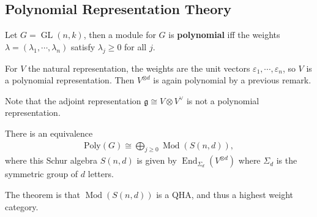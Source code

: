 \hypertarget{polynomial-representation-theory}{%
\subsection{Polynomial Representation
Theory}\label{polynomial-representation-theory}}

Let \(G = \operatorname{GL}(n, k)\), then a module for \(G\) is
\textbf{polynomial} iff the weights
\(\lambda = (\lambda_1, \cdots, \lambda_n)\) satisfy
\(\lambda_j \geq 0\) for all \(j\).

\begin{example}

\begin{example}

For \(V\) the natural representation, the weights are the unit vectors
\(\varepsilon_1, \cdots, \varepsilon_n\), so \(V\) is a polynomial
representation. Then \(V^{\otimes d}\) is again polynomial by a previous
remark.

\end{example}

\end{example}

\begin{remark}

\begin{remark}

Note that the adjoint representation
\({\mathfrak{g}}\cong V\otimes V^\vee\) is not a polynomial
representation.

\end{remark}

\end{remark}

\begin{theorem}[?]

\begin{theorem}[?]

There is an equivalence
\begin{align*}   \mathrm{Poly}(G) \cong \bigoplus_{j\geq 0} {\operatorname{Mod}}(S(n, d)) ,\end{align*}
where this Schur algebra \(S(n, d)\) is given by
\(\operatorname{End}_{\Sigma_d}(V^{\otimes d})\) where \(\Sigma_d\) is
the symmetric group of \(d\) letters.

The theorem is that \({\operatorname{Mod}}(S(n, d))\) is a QHA, and thus
a highest weight category.

\end{theorem}

\end{theorem}

